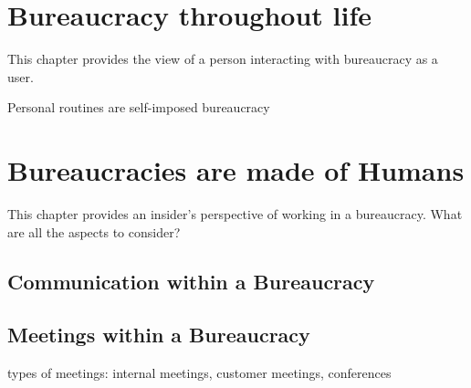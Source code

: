 \documentclass{book}
\begin{document}
\chapter{Bureaucracy throughout life\label{b_throughout_life}}
This chapter provides the view of a person interacting with bureaucracy as a user. 

Personal routines are self-imposed bureaucracy





\chapter{Bureaucracies are made of Humans\label{b_made_of_humans}}
This chapter provides an insider's perspective of working in a bureaucracy. What are all the aspects to consider?














\section{Communication within a Bureaucracy}


\section{Meetings within a Bureaucracy}
types of meetings: internal meetings, customer meetings, conferences 














\clearpage

\printglossaries

\nocite{*} %


\end{document}
